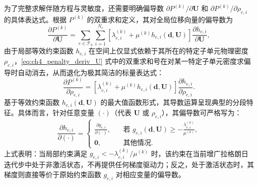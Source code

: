 为了完整求解伴随方程与灵敏度，还需要明确偏导数 $\partial P^{(k)}/\partial \boldsymbol{U}$ 和 $\partial P^{(k)}/\partial\rho_{e,i}$ 的具体表达式。根据 $P^{(k)}$ 的双重求和定义，其对全局位移向量的偏导数为
\begin{equation}
	\frac{\partial P^{(k)}}{\partial \boldsymbol{U}} = \sum_{e \in \mathcal{T}_h} \sum_{i=1}^{N_e} \left[ \lambda_{e,i}^{(k)} + \mu^{(k)} h_{e,i}(\boldsymbol{d}, \boldsymbol{U}) \right] \frac{\partial h_{e,i}}{\partial \boldsymbol{U}},
	\label{eq:ch4_penalty_deriv_U}
\end{equation}
由于局部等效约束函数 $h_{e,i}$ 在空间上仅显式依赖于其所在的特定子单元物理密度 $\rho_{e,i}$，\eqref{eq:ch4_penalty_deriv_U} 式中的双重求和号在对某一特定子单元密度求偏导时自动消去，从而退化为极其简洁的标量表达式：
\[
\frac{\partial P^{(k)}}{\partial\rho_{e,i}} = \left[ \lambda_{e,i}^{(k)} + \mu^{(k)} h_{e,i}(\boldsymbol{d}, \boldsymbol{U}) \right] \frac{\partial h_{e,i}}{\partial\rho_{e,i}}.
\]
基于等效约束函数 $h_{e,i}(\boldsymbol{d}, \boldsymbol{U})$ 的最大值函数形式，其导数运算呈现典型的分段特征。具体而言，针对任意变量 $(\cdot)$（代表 $\boldsymbol{U}$ 或 $\rho_{e,i}$），其偏导数可严格写为：
\begin{equation} \label{eq:ch4_h_derivative}
	\frac{\partial h_{e,i}}{\partial(\cdot)} = 
	\begin{cases}
		\displaystyle \frac{\partial g_{e,i}}{\partial(\cdot)}, &\quad \text{若 } g_{e,i}(\boldsymbol{d}, \boldsymbol{U}) \ge -\frac{\lambda_{e,i}^{(k)}}{\mu^{(k)}}, \\
		\boldsymbol{0}, &\quad \text{其他情况}.
	\end{cases}
\end{equation}
上式表明：当局部约束满足 $g_{e,i} < -\lambda_{e,i}^{(k)}/\mu^{(k)}$ 时，该约束在当前增广拉格朗日迭代步中处于非激活状态，不再提供任何梯度驱动力；反之，处于激活状态时，其梯度则直接等价于原始约束函数 $g_{e,i}$ 对相应变量的偏导数。


